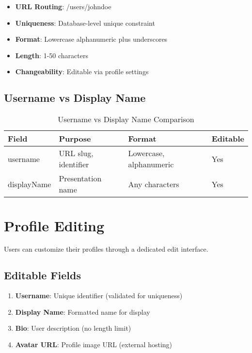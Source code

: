 \documentclass[12pt,a4paper]{report}
\begin{document}
\begin{itemize}
    \item \textbf{URL Routing}: /users/johndoe
    \item \textbf{Uniqueness}: Database-level unique constraint
    \item \textbf{Format}: Lowercase alphanumeric plus underscores
    \item \textbf{Length}: 1-50 characters
    \item \textbf{Changeability}: Editable via profile settings
\end{itemize}

\subsection{Username vs Display Name}

\begin{table}[H]
\centering
\caption{Username vs Display Name Comparison}
\begin{tabular}{@{}llll@{}}
\toprule
\textbf{Field} & \textbf{Purpose} & \textbf{Format} & \textbf{Editable} \\ \midrule
username & URL slug, identifier & Lowercase, alphanumeric & Yes \\
displayName & Presentation name & Any characters & Yes \\ \bottomrule
\end{tabular}
\end{table}

\section{Profile Editing}

Users can customize their profiles through a dedicated edit interface.

\subsection{Editable Fields}

\begin{enumerate}
    \item \textbf{Username}: Unique identifier (validated for uniqueness)
    \item \textbf{Display Name}: Formatted name for display
    \item \textbf{Bio}: User description (no length limit)
    \item \textbf{Avatar URL}: Profile image URL (external hosting)
\end{enumerate}
\end{document}
